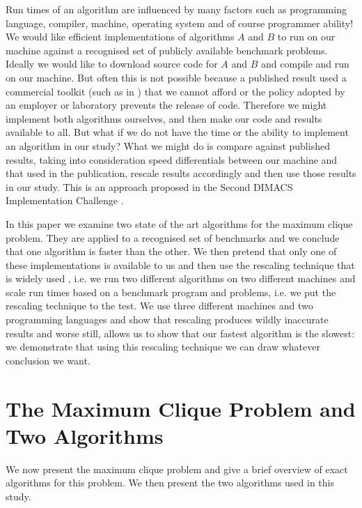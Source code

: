 \documentclass[runningheads]{llncs}
\begin{document}
Run times of an algorithm are influenced by many factors such as programming language, compiler, machine, operating system
and of course programmer ability! We would like efficient implementations of algorithms $A$ and $B$ to run on our machine 
against a recognised set of publicly available benchmark problems. Ideally we would like to download source code for $A$ and $B$
and compile and run on our machine. 
But often this is not possible because a published result used 
a commercial toolkit (such as in \cite{regin2003}) that we cannot afford or the policy adopted by an employer or laboratory
prevents the release of code. Therefore we might implement both algorithms ourselves, and then
make our code and results available to all. 
But what if we do not have the time or the ability to implement an algorithm in our study?
What we might do is compare against published results, taking into consideration speed differentials between our machine and that used in the 
publication, rescale results accordingly and then use those results in our study. This is an approach proposed in the Second DIMACS Implementation Challenge \cite{dimacs93}.



In this paper we examine two state of the art algorithms for the maximum clique problem. They are applied to a recognised 
set of benchmarks and we conclude that one algorithm is faster than the other. We then pretend that only
one of these implementations is available to us and then use the rescaling technique that is widely used \cite{dimacs93}, i.e.
we run two different algorithms on two different machines and scale run times based on a benchmark program and problems, i.e. we put the rescaling technique
to the test. We use three different machines and two programming languages and show that rescaling produces wildly inaccurate results and worse still,
allows us to show that our fastest algorithm is the slowest: we demonstrate that using this
rescaling technique we can draw whatever conclusion we want.

\section{The Maximum Clique Problem and Two Algorithms}
\vspace{-1.5mm}
We now present the maximum clique problem and give a brief overview of exact algorithms for this problem. We then present 
the two algorithms used in this study.
\end{document}
